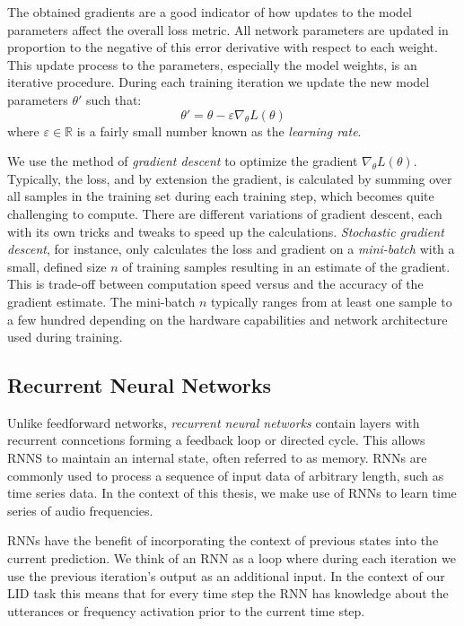 The obtained gradients are a good indicator of how updates to the model parameters affect the overall loss metric. All network parameters are updated in proportion to the negative of this error derivative with respect to each weight. This update process to the parameters, especially the model weights, is an iterative procedure. During each training iteration we update the new model parameters $\theta'$ such that:
$$
\theta' = \theta - \varepsilon \nabla_\theta L(\theta)
$$
where $\varepsilon \in\mathbb{R}$ is a fairly small number known as the \emph{learning rate}. 

We use the method of \emph{gradient descent} to optimize the gradient $\nabla_\theta L(\theta)$. Typically, the loss, and by extension the gradient, is calculated by summing over all samples in the training set during each training step, which becomes quite challenging to compute. There are different variations of gradient descent, each with its own tricks and tweaks to speed up the calculations. \emph{Stochastic gradient descent}, for instance, only calculates the loss and gradient on a \emph{mini-batch} with a small, defined size $n$ of training samples resulting in an estimate of the gradient. This is trade-off between computation speed versus and the accuracy of the gradient estimate. The mini-batch $n$ typically ranges from at least one sample to a few hundred depending on the hardware capabilities and network architecture used during training.


\subsection{Recurrent Neural Networks}
Unlike feedforward networks, \emph{recurrent neural networks} contain layers with recurrent conncetions forming a feedback loop or directed cycle. This allows RNNS to maintain an internal state, often referred to as memory. RNNs are commonly used to process a sequence of input data of arbitrary length, such as time series data. In the context of this thesis, we make use of RNNs to learn time series of audio frequencies.

	RNNs have the benefit of incorporating the context of previous states into the current prediction. We think of an RNN as a loop where during each iteration we use the previous iteration's output as an additional input. In the context of our LID task this means that for every time step the RNN has knowledge about the utterances or frequency activation prior to the current time step.

